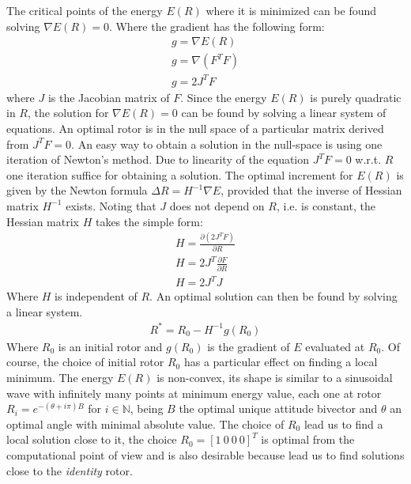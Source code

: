 \documentclass{birkjour}
\numberwithin{equation}{section}
\begin{document}
The critical points of the energy $E(R)$ where it is minimized can be found solving $\nabla E(R) = 0$. Where the gradient has the following form:
\begin{eqnarray*}
g = \nabla E(R)\\
g = \nabla (F^T F)\\
g = 2 J^T F
\end{eqnarray*}
where $J$ is the Jacobian matrix of $F$. Since the energy $E(R)$ is purely quadratic in $R$, the solution for $\nabla E(R) = 0$ can be found by solving a linear system of equations. An optimal rotor is in the null space of a particular matrix derived from $J^T F = 0$. An easy way to obtain a solution in the null-space is using one iteration of Newton's method. Due to linearity of the equation $J^T F = 0$ w.r.t. $R$ one iteration suffice for obtaining a solution. The optimal increment for $E(R)$ is given by the Newton formula $\Delta R = H^{-1} \nabla E$, provided that the inverse of Hessian matrix $H^{-1}$ exists. Noting that $J$ does not depend on $R$, i.e. is constant, the Hessian matrix $H$ takes the simple form:
\begin{eqnarray*}
H = \frac{\partial(2 J^T F)}{\partial R} \\
H = 2 J^T \frac{\partial F}{\partial R}\\
H = 2 J^T J
\end{eqnarray*}
Where $H$ is independent of $R$. An optimal solution can then be found by solving a linear system.
\begin{eqnarray*}
R^* = R_0 - H^{-1} g(R_0)
\end{eqnarray*}
Where $R_0$ is an initial rotor and $g(R_0)$ is the gradient of $E$ evaluated at $R_0$. Of course, the choice of initial rotor $R_0$ has a particular effect on finding a local minimum. The energy $E(R)$ is non-convex, its shape is similar to a sinusoidal wave with infinitely many points at minimum energy value, each one at rotor $R_i = e^{-(\theta + i \pi) B}$ for $i \in \mathbb N$, being $B$ the optimal unique attitude bivector and $\theta $ an optimal angle with minimal absolute value. The choice of $R_0$ lead us to find a local solution close to it, the choice $R_0 = [1 \ 0 \ 0 \ 0]^T$ is optimal from the computational point of view and is also desirable because lead us to find solutions close to the \emph{identity} rotor. 
\end{document}
